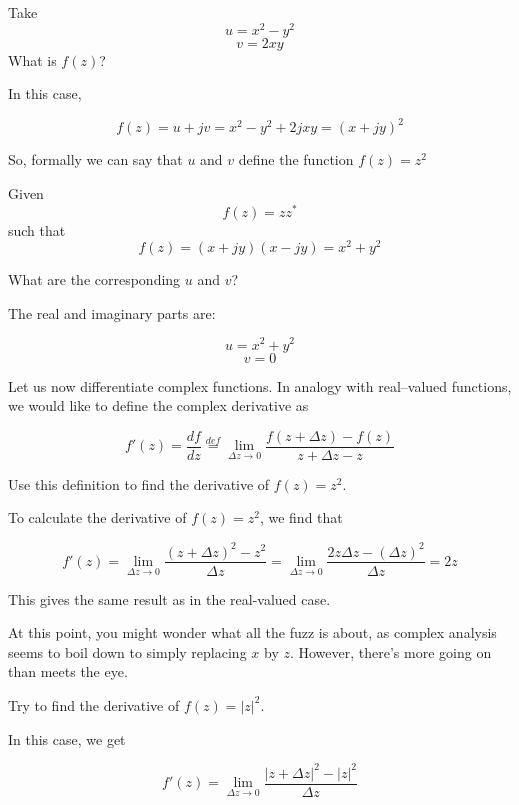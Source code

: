 \begin{cue}
Take
$$u = x^2 - y^2$$
$$v = 2 x y$$
What is $f(z)$?
\end{cue}

In this case,

$$f(z) = u + j v = x^2 - y^2 +2j x y = (x + jy)^2$$

So, formally we can say that $u$ and $v$ define the function $f(z) = z^2$

\begin{cue}
Given
$$f(z) = z z^* $$
such that
$$f(z) = (x + jy)(x - jy) = x^2 + y^2$$

What are the corresponding $u$ and $v$?
\end{cue}

The real and imaginary parts are:

$$u = x^2 + y^2$$
$$v = 0$$


\pagebreak



Let us now differentiate complex functions. In analogy with real--valued functions, we would like to define the complex derivative as

\begin{equation}
f' (z)=\frac{df}{dz} \stackrel{def}{=} \lim_{\Delta z \to 0} \frac{f(z+\Delta z) - f(z)}{z+\Delta z - z} \label{eq-deriv}
\end{equation} 

\begin{cue}
Use this definition to find the derivative of $f(z)=z^2$.
\end{cue}

To calculate the derivative of  $f(z)=z^2$, we find that

$$f'(z)=\lim_{\Delta z \to 0} \frac{(z+\Delta z)^2 - z^2}{\Delta z} = \lim_{\Delta z \to 0} \frac{2 z \Delta z - (\Delta z)^2}{\Delta z}=2z $$

This gives the same result as in the real-valued case.

At this point, you might wonder what all the fuzz is about, as complex analysis seems to boil down to simply replacing $x$ by $z$. However, there's more going on than meets the eye.

\begin{cue}
Try to find the derivative of $f(z)=|z|^2$.
\end{cue}

In this case, we get

$$f'(z)=\lim_{\Delta z \to 0} \frac{|z+\Delta z|^2 - |z|^2}{\Delta z} $$


